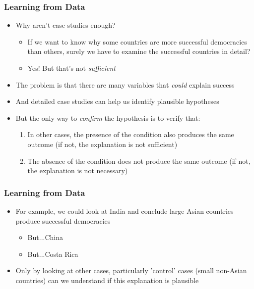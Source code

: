 \documentclass[xcolor=x11names,compress]{beamer}\usepackage[]{graphicx}\usepackage[]{color}
\renewcommand{\(}{\begin{columns}}
\renewcommand{\)}{\end{columns}}
\newcommand{\<}[1]{\begin{column}{#1}}
\renewcommand{\>}{\end{column}}
\begin{document}
\begin{frame}
\frametitle{Learning from Data}
\begin{itemize}
\item Why aren't case studies enough?
\begin{itemize}
\item If we want to know why some countries are more successful democracies than others, surely we have to examine the successful countries in detail?
\item Yes! But that's not \textit{sufficient}
\end{itemize}
\item The problem is that there are many variables that \textit{could} explain success
\item And detailed case studies can help us identify plausible hypotheses
\item But the only way to \textit{confirm} the hypothesis is to verify that:
\begin{enumerate}
\item In other cases, the presence of the condition also produces the same outcome (if not, the explanation is not sufficient)
\item The absence of the condition does not produce the same outcome (if not, the explanation is not necessary)
\end{enumerate}
\end{itemize}
\end{frame}

\begin{frame}
\frametitle{Learning from Data}
\begin{itemize}
\item For example, we could look at India and conclude large Asian countries produce successful democracies
\begin{itemize}
\item But...China
\item But...Costa Rica
\end{itemize}
\item Only by looking at other cases, particularly 'control' cases (small non-Asian countries) can we understand if this explanation is plausible
\end{itemize}
\end{frame}
\end{document}
